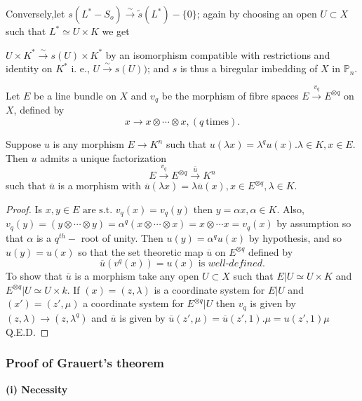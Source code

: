{Conversely,let $s(L^*-S_o) \xrightarrow{\sim} \tilde{s}(L^*)-\{0\}$;
again by choosing an open $U \subset X$ such that $L^* \simeq U
\times K$ we get  

$ U \times K^* \xrightarrow{\sim}  s(U) \times K^*$ by an isomorphism
compatible with restrictions and identity on $K^*$  i. e., $U
\xrightarrow{\sim} s(U))$; and $s$ is thus a biregular imbedding of
$X \text{ in } \mathbb{P}_n $.  

\begin{lemma}\label{chap1:sec2:lem2}%
  Let $E$ be a line bundle on $X$ and $v_q$ be the morphism of fibre
  spaces $E \xrightarrow{v_q} E^{\otimes q}$ on  $X$, defined by  
  $$
  x \to x \otimes \cdots \otimes x, (q ~\text{times}).
  $$
\end{lemma}

Suppose $u$ is any morphism $E \to K^n$ such that $u(\lambda x)
=\lambda^q u(x). \lambda \in K, x \in E$. Then $u$ admits a unique
factorization  
$$
E \xrightarrow{v_q} E^{\otimes q}\xrightarrow{\bar{u}} K^n
$$
such that $\bar{u}$ is a morphism with $\overline {u}(\lambda x) =
\lambda \overline {u}(x), x \in E^{\otimes q},\lambda \in K$. 

\begin{proof}%
  Is $x,y \in E \text{ are s.t. } v_q(x)=v_q(y) \text{ then } y=
  \alpha x, \alpha \in K$. 
  Also, $v_q(y)=(y \otimes \cdots \otimes y) =\alpha^q (x \otimes
  \cdots \otimes x)= x \otimes \cdots x = v_q (x)$ by assumption so
  that $\alpha$ is a $q^{th}-$ root of unity. Then $u(y)= \alpha^q
  u(x)$ by hypothesis, and so $u(y)=u(x)$ so that the set theoretic
  map $\overline {u} \text{ on } E^{\otimes q}$ defined by  
  $$
  \overline {u}(v^q(x))=u(x) \text{ is }\textit{well-defined}.
  $$
  To show that $\overline {u}$ is a morphism take any open $U \subset X$
  such that $E|U \simeq U \times K$ and $E^{\otimes q}|U \simeq U
  \times k$. If $(x)=(z,\lambda)$ is a coordinate system for $E|U$ and
  $(x')=(z', \mu)$ 
  a coordinate system for $E^{\otimes q}|U$ then $v_q$ is given by
  $(z,\lambda) \to (z,\lambda^q)$ and $\overline {u}$ is given by
  $\overline{u} (z', \mu) = \overline {u}(z',1).\mu =u(z',1)\mu$
  \hfill{Q.E.D.} 
\end{proof}

\subsubsection*{Proof of Grauert's theorem}\pageoriginale

\textbf{(i)  Necessity}

}
